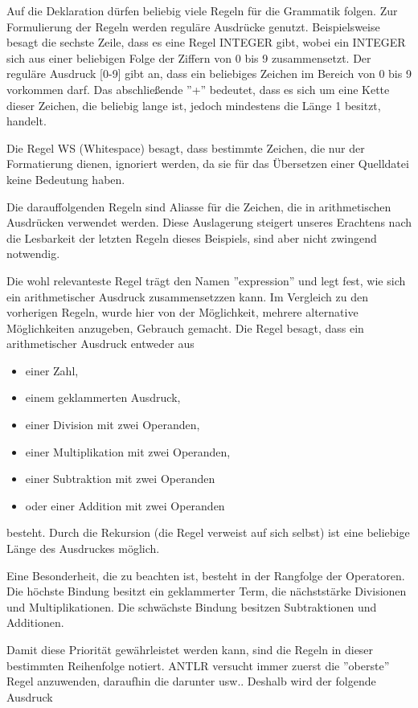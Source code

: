Auf die Deklaration dürfen beliebig viele Regeln für die Grammatik folgen. Zur Formulierung der Regeln werden reguläre Ausdrücke genutzt. Beispielsweise besagt die sechste Zeile, dass es eine Regel INTEGER gibt, wobei ein INTEGER sich aus einer beliebigen Folge der Ziffern von 0 bis 9 zusammensetzt. Der reguläre Ausdruck [0-9] gibt an, dass ein beliebiges Zeichen im Bereich von 0 bis 9 vorkommen darf. Das abschließende ''+'' bedeutet, dass es sich um eine Kette dieser Zeichen, die beliebig lange ist, jedoch mindestens die Länge 1 besitzt, handelt.

Die Regel WS (Whitespace) besagt, dass bestimmte Zeichen, die nur der Formatierung dienen, ignoriert werden, da sie für das Übersetzen einer Quelldatei keine Bedeutung haben.

Die darauffolgenden Regeln sind Aliasse für die Zeichen, die in arithmetischen Ausdrücken verwendet werden. Diese Auslagerung steigert unseres Erachtens nach die Lesbarkeit der letzten Regeln dieses Beispiels, sind aber nicht zwingend notwendig.

Die wohl relevanteste Regel trägt den Namen ''expression'' und legt fest, wie sich ein arithmetischer Ausdruck zusammensetzzen kann. Im Vergleich zu den vorherigen Regeln, wurde hier von der Möglichkeit, mehrere alternative Möglichkeiten anzugeben, Gebrauch gemacht. Die Regel besagt, dass ein arithmetischer Ausdruck entweder aus 
\begin{itemize}
\item einer Zahl,
\item einem geklammerten Ausdruck,
\item einer Division mit zwei Operanden,
\item einer Multiplikation mit zwei Operanden,
\item einer Subtraktion mit zwei Operanden
\item oder einer Addition mit zwei Operanden
\end{itemize}
besteht.
Durch die Rekursion (die Regel verweist auf sich selbst) ist eine beliebige Länge des Ausdruckes möglich.

Eine Besonderheit, die zu beachten ist, besteht in der Rangfolge der Operatoren. Die höchste Bindung besitzt ein geklammerter Term, die nächststärke Divisionen und Multiplikationen. Die schwächste Bindung besitzen Subtraktionen und Additionen.

Damit diese Priorität gewährleistet werden kann, sind die Regeln in dieser bestimmten Reihenfolge notiert. ANTLR versucht immer zuerst die ''oberste'' Regel anzuwenden, daraufhin die darunter usw.. Deshalb wird der folgende Ausdruck 

